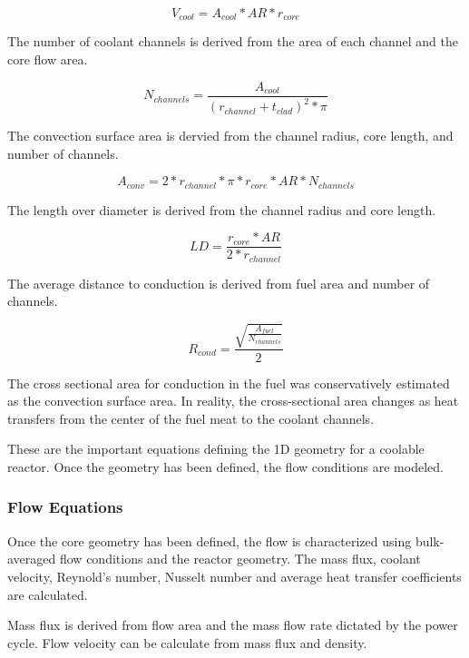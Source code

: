 \begin{equation}
    V_{cool} = A_{cool}*AR*r_{core}
\end{equation}

The number of coolant channels is derived from the area of each channel and the
core flow area.

\begin{equation}
    N_{channels} = \frac{A_{cool}}{(r_{channel} + t_{clad})^2 * \pi}
\end{equation}

The convection surface area is dervied from the channel radius, core length, and
number of channels.

\begin{equation}
    A_{conv} = 2*r_{channel}*\pi*r_{core}*AR*N_{channels}    
\end{equation}

The length over diameter is derived from the channel radius and core length.

\begin{equation}
    LD = \frac{r_{core}*AR}{2*r_{channel}}
\end{equation}

The average distance to conduction is derived from fuel area and number of
channels.

\begin{equation}
    R_{cond} = \frac{\sqrt{\frac{A_{fuel}}{N_{channels}}}}{2}
    \label{r_cond}
\end{equation}

The cross sectional area for conduction in the fuel was conservatively estimated
as the convection surface area. In reality, the cross-sectional area changes as
heat transfers from the center of the fuel meat to the coolant channels.


These are the important equations defining the 1D geometry for a coolable
reactor. Once the geometry has been defined, the flow conditions are modeled.

\subsubsection{Flow Equations}

Once the core geometry has been defined, the flow is characterized using
bulk-averaged flow conditions and the reactor geometry. The mass flux, coolant
velocity, Reynold's number, Nusselt number and average heat transfer
coefficients are calculated.

Mass flux is derived from flow area and the mass flow rate dictated by the power
cycle. Flow velocity can be calculate from mass flux and density.

